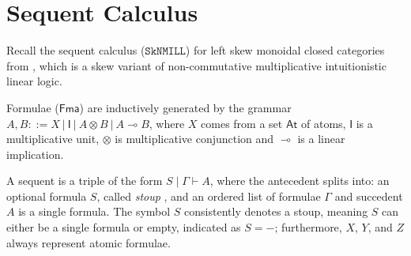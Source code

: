 \documentclass[sn-mathphys-num]{sn-jnl}%
\newcommand{\vd}{\vdash}
\newcommand{\ot}{\otimes}
\newcommand{\lolli}{\multimap}
\newcommand{\I}{\mathsf{I}}
\newcommand{\SkNMILL}{$\mathtt{SkNMILL}$}
\newcommand{\mf}[1]{\mathsf{#1}}
\theoremstyle{thmstyleone}%
\theoremstyle{thmstyletwo}%
\theoremstyle{thmstylethree}%
\begin{document}
\section{Sequent Calculus}\label{sec:syntax}
Recall the sequent calculus (\SkNMILL) for left skew monoidal closed categories from \cite{UVW:protsn}, which is a skew variant of non-commutative multiplicative intuitionistic linear logic.

Formulae ($\mf{Fma}$) are inductively generated by the grammar $A, B::= X \ | \ \I \ | \ A \ot B \ | \ A \lolli B$, where $X$ comes from a set $\mathsf{At}$ of atoms, $\I$ is a multiplicative unit, $\ot$ is multiplicative conjunction and $\lolli$ is a linear implication.

A sequent is a triple of the form $S \mid \Gamma \vd A$, where the antecedent splits into: an optional formula $S$, called \emph{stoup} \cite{girard:constructive:91}, and an ordered list of formulae $\Gamma$ and succedent $A$ is a single formula.
The symbol $S$ consistently denotes a stoup, meaning $S$ can either be a single formula or empty, indicated as $S = {-}$; furthermore, $X$, $Y$, and $Z$ always represent atomic formulae.
\end{document}
